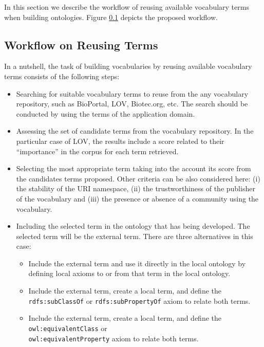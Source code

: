 
In this section we describe the workflow of reusing available vocabulary terms when building ontologies.
Figure \ref{} depicts the proposed workflow.


\subsection{Workflow on Reusing Terms}
In a nutshell, the task of building vocabularies by reusing available vocabulary terms consists of the following steps:

\begin{itemize}
	\item Searching for suitable vocabulary terms to reuse from the any vocabulary repository, such as BioPortal, LOV, Biotec.org, etc. The search should be conducted by using the terms of the application domain.
	\item Assessing the set of candidate terms from the vocabulary repository. In the particular case of LOV, the results include a score related to their ``importance'' in the corpus for each term retrieved.
	\item Selecting the most appropriate term taking into the account its score from the candidates terms proposed. Other criteria can be also considered here: (i) the stability of the URI namespace, (ii) the trustworthiness of the publisher of the vocabulary and (iii) the presence or absence of a community using the vocabulary.
	\item Including the selected term in the ontology that has being developed. The selected term will be the external term. There are three alternatives in this case: 
	\begin{itemize}
		\item Include the external term and use it directly in the local ontology by defining local axioms to or from that term in the local ontology.
		\item Include the external term, create a local term, and define the {\tt rdfs:subClassOf} or {\tt rdfs:subPropertyOf} axiom to relate both terms.
		\item Include the external term, create a local term, and define the {\tt owl:equivalentClass} or \\ {\tt owl:equivalentProperty} axiom to relate both terms. 				
	\end{itemize}
\end{itemize}

